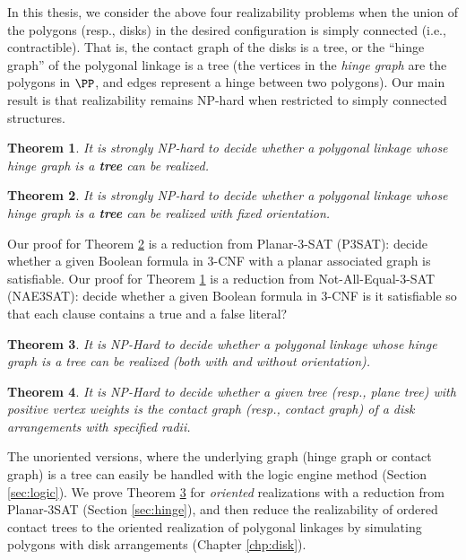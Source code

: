 \documentclass[10pt]{CSUNthesis}
\theoremstyle{plain}%
\newtheorem{thm}{Theorem}
\theoremstyle{definition}
\theoremstyle{remark}
\begin{document}
In this thesis, we consider the above four realizability problems when the union of the polygons 
(resp., disks) in the desired configuration is simply connected (i.e., contractible). That is, the 
contact graph of the disks is a tree, or the ``hinge graph'' of the polygonal linkage is a tree (the 
vertices in the \emph{hinge graph} are the polygons in $\PP$, and edges represent a hinge between 
two polygons). Our main result is that realizability remains NP-hard when restricted to simply 
connected structures.
 
\begin{thm}\label{thm:hinge2}
It is strongly NP-hard to decide whether a polygonal linkage whose hinge graph is a \textbf{tree} can be realized.
\end{thm}
\begin{thm}\label{thm:hinge3}
It is strongly NP-hard to decide whether a polygonal linkage whose hinge graph is a \textbf{tree} can be realized with fixed orientation.
\end{thm}
Our proof for Theorem \ref{thm:hinge3} is a reduction from {\sc Planar-3-SAT} (P3SAT): decide whether a given Boolean formula in 3-CNF with a planar associated graph is satisfiable. 
Our proof for Theorem \ref{thm:hinge2} is a reduction from {\sc Not-All-Equal-3-SAT} (NAE3SAT): decide whether a given Boolean formula in 3-CNF  is it satisfiable so that each clause contains a true and a false literal?


\begin{thm}\label{thm:hinge}
It is NP-Hard to decide whether a polygonal linkage whose hinge graph is a tree can be realized 
(both with and without orientation).
\end{thm}

\begin{thm}\label{thm:disk}
It is NP-Hard to decide whether a given tree (resp., plane tree) with positive vertex weights
is the contact graph (resp., contact graph) of a disk arrangements with specified radii.
\end{thm}

The unoriented versions, where the underlying graph (hinge graph or contact graph) is a tree can 
easily be handled with the logic engine method (Section \ref{sec:logic}). We prove 
Theorem \ref{thm:hinge} for \emph{oriented} realizations with a reduction from {\sc Planar-3SAT} 
(Section \ref{sec:hinge}), and then reduce the realizability of ordered contact trees to the 
oriented realization of polygonal linkages by simulating polygons with disk arrangements
(Chapter \ref{chp:disk}).
\end{document}
